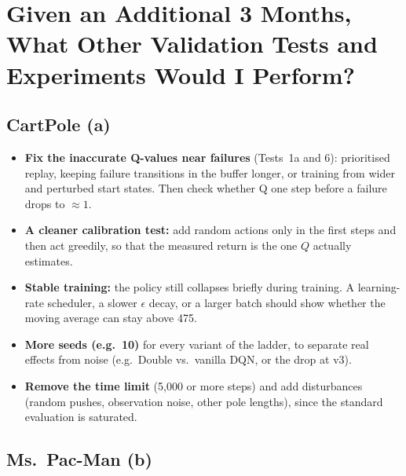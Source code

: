 \section{Given an Additional 3 Months, What Other Validation Tests and Experiments Would I Perform?}
\label{sec:outlook}

\subsection{CartPole (a)}

\begin{itemize}
  \item \textbf{Fix the inaccurate Q-values near failures} (Tests~1a and 6): prioritised replay, keeping failure transitions in the buffer longer, or training from wider and perturbed start states. Then check whether Q one step before a failure drops to $\approx 1$.
  \item \textbf{A cleaner calibration test:} add random actions only in the first steps and then act greedily, so that the measured return is the one $Q$ actually estimates.
  \item \textbf{Stable training:} the policy still collapses briefly during training. A learning-rate scheduler, a slower $\epsilon$ decay, or a larger batch should show whether the moving average can stay above 475.
  \item \textbf{More seeds (e.g.\ 10)} for every variant of the ladder, to separate real effects from noise (e.g.\ Double vs.\ vanilla DQN, or the drop at v3).
  \item \textbf{Remove the time limit} (5,000 or more steps) and add disturbances (random pushes, observation noise, other pole lengths), since the standard evaluation is saturated.
\end{itemize}

\subsection{Ms.\ Pac-Man (b)}


